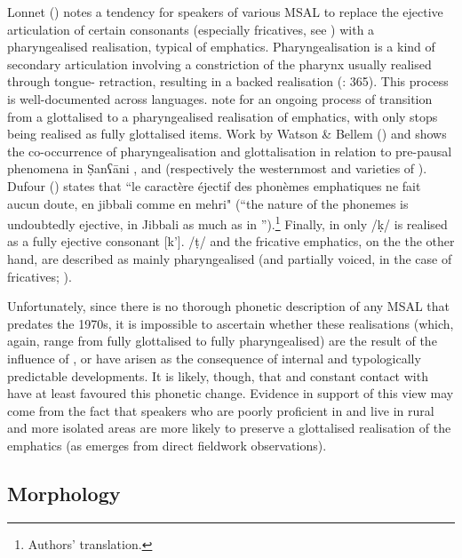 \documentclass[output=paper]{langsci/langscibook}
\begin{document}
Lonnet (\citeyear[299]{Lonnet2011}) notes a tendency for speakers of various MSAL to replace the ejective articulation of certain consonants (especially fricatives, see \citealt{RidouaneGendrot2017}) with a pharyngealised realisation, typical of  emphatics. Pharyngealisation is a kind of secondary articulation involving a constriction of the pharynx usually realised through tongue- retraction, resulting in a backed realisation (\citealt{LadefogedMaddieson1996}: 365). This process is well-documented across  languages. \citet{NaumkinPorkhomovsky1981} note for  an ongoing process of transition from a glottalised to a pharyngealised realisation of emphatics, with only stops being realised as fully glottalised items. Work by Watson \& Bellem (\citeyear{WatsonBellem2010,WatsonBellem2011}) and \citet{WatsonHeselwood2016} shows the co-occurrence of pharyngealisation and glottalisation in relation to pre-pausal phenomena in \d{S}anʕāni ,  and  (respectively the westernmost  and  varieties of ). Dufour (\citeyear[22]{Dufour2016}) states that ``le caractère éjectif des phonèmes emphatiques ne fait aucun doute, en jibbali comme en mehri" (“the nature of the  phonemes is undoubtedly ejective, in Jibbali as much as in ”).\footnote{Authors' translation.} Finally, in  only /ḳ/ is realised as a fully ejective consonant [k’]. /ṭ/ and the fricative emphatics, on the the other hand, are described as mainly pharyngealised (and partially voiced, in the case of fricatives; \citealt{Gasparini2017}).

Unfortunately, since there is no thorough phonetic description of any MSAL that predates the 1970s, it is impossible to ascertain whether these realisations (which, again, range from fully glottalised to fully pharyngealised) are the result of the influence of , or have arisen as the consequence of internal and typologically predictable developments. It is likely, though, that  and constant contact with  have at least favoured this phonetic change. Evidence in support of this view may come from the fact that speakers who are poorly proficient in  and live in rural and more isolated areas are more likely to preserve a glottalised realisation of the emphatics (as emerges from direct fieldwork observations).


 
 \subsection{Morphology} 
\end{document}
